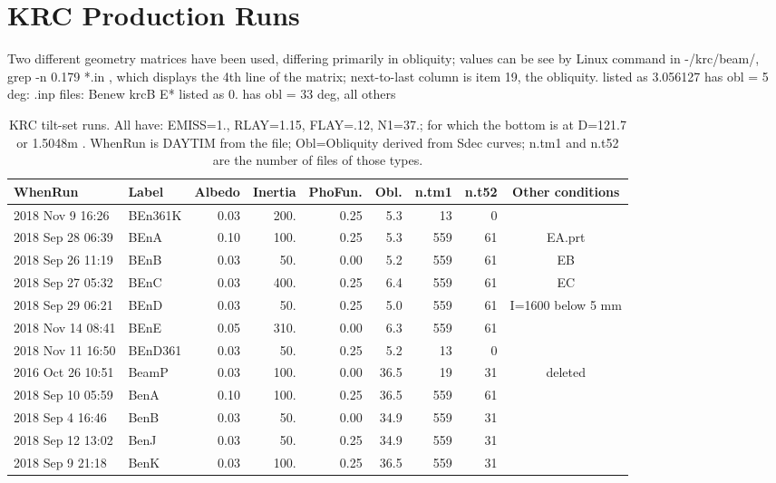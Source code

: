 \documentclass{article}
\begin{document}
\section{KRC Production Runs}  %
Two different geometry matrices have been used, differing primarily in obliquity; values can be see by Linux command in -/krc/beam/,   grep -n 0.179 *.in , which displays the 4th line of the matrix; next-to-last column is item 19, the obliquity. 
\qi listed as 3.056127 has obl = 5 deg: .inp files: Benew  krcB  E*
\qi listed as 0. has obl = 33 deg, all others

\begin{table} [!h]
\caption[KRC tilt-set runs]{KRC tilt-set runs. All have: EMISS=1., RLAY=1.15, FLAY=.12, N1=37.; for which the bottom is at  D=121.7 or 1.5048m . WhenRun is DAYTIM from the file; Obl=Obliquity derived from Sdec curves; n.tm1 and n.t52 are the number of files of those types. }
\begin{center}
\begin{tabular}{| l l   r  r  r r | r r | c | } \hline \hline
WhenRun & Label & Albedo & Inertia & PhoFun. & Obl. & n.tm1 & n.t52 & Other conditions  \\  \hline
2018 Nov  9 16:26 & BEn361K & 0.03 &   200. & 0.25 &  5.3 &   13 &   0 & \\
2018 Sep 28 06:39 &    BEnA & 0.10 &   100. & 0.25 &  5.3 &  559 &  61 & EA.prt \\
2018 Sep 26 11:19 &    BEnB & 0.03 &    50. & 0.00 &  5.2 &  559 &  61 & EB \\
2018 Sep 27 05:32 &    BEnC & 0.03 &   400. & 0.25 &  6.4 &  559 &  61 & EC \\
2018 Sep 29 06:21 &    BEnD & 0.03 &    50. & 0.25 &  5.0 &  559 &  61 & I=1600 below 5 mm \\
2018 Nov 14 08:41 &    BEnE & 0.05 &   310. & 0.00 &  6.3 &  559 &  61 & \\

2018 Nov 11 16:50 & BEnD361 & 0.03 &    50. & 0.25 &  5.2 &   13 &   0 & \\
2016 Oct 26 10:51 &   BeamP & 0.03 &   100. & 0.00 & 36.5 &   19 &  31 & deleted \\
2018 Sep 10 05:59 &    BenA & 0.10 &   100. & 0.25 & 36.5 &  559 &  61 & \\
2018 Sep  4 16:46 &    BenB & 0.03 &    50. & 0.00 & 34.9 &  559 &  31 & \\
2018 Sep 12 13:02 &    BenJ & 0.03 &    50. & 0.25 & 34.9 &  559 &  31 & \\
2018 Sep  9 21:18 &    BenK & 0.03 &   100. & 0.25 & 36.5 &  559 &  31 & \\
 \hline
\end{tabular} \end{center}
\end{table}
\end{document}
